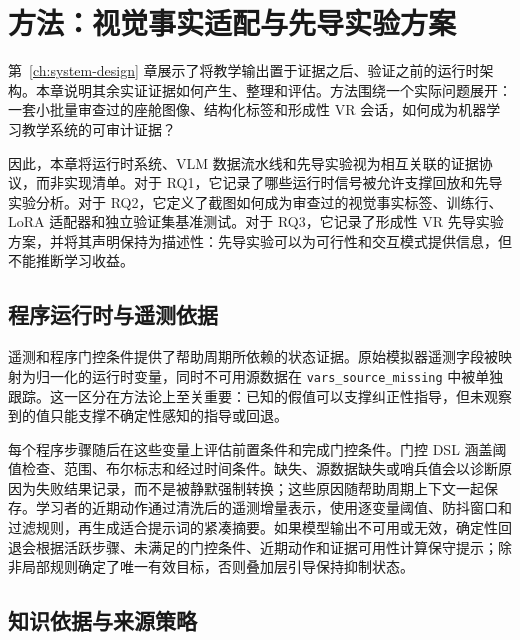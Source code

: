 %
\chapter{方法：视觉事实适配与先导实验方案}\label{ch:methodology}

第~\ref{ch:system-design} 章展示了将教学输出置于证据之后、验证之前的运行时架构。本章说明其余实证证据如何产生、整理和评估。方法围绕一个实际问题展开：一套小批量审查过的座舱图像、结构化标签和形成性 VR 会话，如何成为机器学习教学系统的可审计证据？

因此，本章将运行时系统、VLM 数据流水线和先导实验视为相互关联的证据协议，而非实现清单。对于 RQ1，它记录了哪些运行时信号被允许支撑回放和先导实验分析。对于 RQ2，它定义了截图如何成为审查过的视觉事实标签、训练行、LoRA 适配器和独立验证集基准测试。对于 RQ3，它记录了形成性 VR 先导实验方案，并将其声明保持为描述性：先导实验可以为可行性和交互模式提供信息，但不能推断学习收益。

\section{程序运行时与遥测依据}\label{sec:method-telemetry}

遥测和程序门控条件提供了帮助周期所依赖的状态证据。原始模拟器遥测字段被映射为归一化的运行时变量，同时不可用源数据在 \texttt{vars\_source\_missing} 中被单独跟踪。这一区分在方法论上至关重要：已知的假值可以支撑纠正性指导，但未观察到的值只能支撑不确定性感知的指导或回退。

每个程序步骤随后在这些变量上评估前置条件和完成门控条件。门控 DSL 涵盖阈值检查、范围、布尔标志和经过时间条件。缺失、源数据缺失或哨兵值会以诊断原因为失败结果记录，而不是被静默强制转换；这些原因随帮助周期上下文一起保存。学习者的近期动作通过清洗后的遥测增量表示，使用逐变量阈值、防抖窗口和过滤规则，再生成适合提示词的紧凑摘要。如果模型输出不可用或无效，确定性回退会根据活跃步骤、未满足的门控条件、近期动作和证据可用性计算保守提示；除非局部规则确定了唯一有效目标，否则叠加层引导保持抑制状态。

\section{知识依据与来源策略}\label{sec:method-knowledge}

